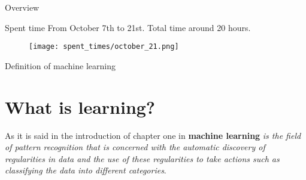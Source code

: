 


\begin{frame}{Overview}
  \tableofcontents
\end{frame}


\begin{frame}{Spent time}
  From October 7th to 21st.  
  Total time around 20 hours. 
  \begin{figure}[t]
  \texttt{[image: spent\_times/october\_21.png]}
  \centering
  \end{figure}
\end{frame}
\begin{frame}{Definition of machine learning}%
  \section{What is learning?}
    As it is said in the introduction of chapter one in  \cite{BishopPatternRecognition}
 \textbf{machine learning} \textit{is the field of pattern 
recognition that is concerned with the automatic
 discovery of regularities in data and the use of
these regularities to take actions such as 
classifying the data into different categories}.
\end{frame}

